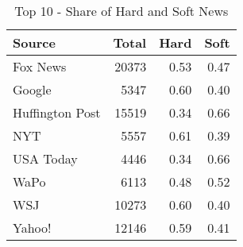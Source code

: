 \begin{table}[ht]
\centering
\caption{Top 10 - Share of Hard and Soft News} 
\label{tab:top10_share_hard_soft}
\begin{tabular}{lrrr}
  \hline
Source & Total & Hard & Soft \\ 
  \hline
Fox News & 20373 & 0.53 & 0.47 \\ 
  Google & 5347 & 0.60 & 0.40 \\ 
  Huffington Post & 15519 & 0.34 & 0.66 \\ 
  NYT & 5557 & 0.61 & 0.39 \\ 
  USA Today & 4446 & 0.34 & 0.66 \\ 
  WaPo & 6113 & 0.48 & 0.52 \\ 
  WSJ & 10273 & 0.60 & 0.40 \\ 
  Yahoo! & 12146 & 0.59 & 0.41 \\ 
   \hline
\end{tabular}
\end{table}

